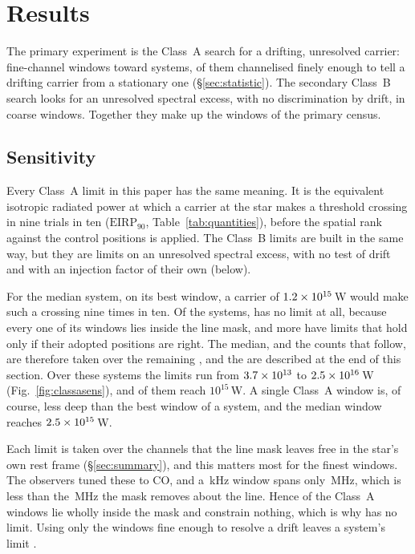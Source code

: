 \section{Results}
\label{sec:results}

The primary experiment is the Class~A search for a drifting, unresolved
carrier: \NWinA{} fine-channel windows toward \NSysClassA{} systems,
\EdrNWinA{} of them channelised finely enough to tell a drifting carrier from
a stationary one (\S\ref{sec:statistic}). The secondary Class~B search looks
for an unresolved spectral excess, with no discrimination by drift, in
\NWinB{} coarse windows. Together they make up the \NWindows{} windows of the
primary census.

\subsection{Sensitivity}
\label{sec:pninetysel}

Every Class~A limit in this paper has the same meaning. It is the
equivalent isotropic radiated power at which a carrier at the star makes a
threshold crossing in nine trials in ten ($\mathrm{EIRP}_{90}$,
Table~\ref{tab:quantities}), before the spatial rank against the control
positions is applied. The Class~B limits are built in the same way, but
they are limits on an unresolved spectral excess, with no test of drift and
with an injection factor of their own (below).

For the median system, on its best window, a carrier of
$1.2\times10^{15}$\,W would make such a crossing nine times in ten. Of the \NSysClassA{} systems,
\NSysALostName{} has no limit at all, because every one of its windows lies
inside the line mask, and \OmNFlagWord{} more have limits that hold only if
their adopted positions are right. The median, and the counts that follow,
are therefore taken over the remaining \NSysALimSum, and the
\OmNFlagWord{} are described at the end of this section. Over these systems
the limits run from $3.7\times10^{13}$ to $2.5\times10^{16}$\,W
(Fig.~\ref{fig:classasens}), and \NSysEfifteen{} of them reach
$10^{15}$\,W. A single Class~A window is, of course, less deep than the best
window of a system, and the median window reaches
$2.5\times10^{15}$\,W.

Each limit is taken over the channels that the line mask leaves free in the
star's own rest frame (\S\ref{sec:summary}), and this matters most for the
finest windows. The observers tuned these to CO, and a
\UmFineChanKHz\,kHz window spans only \UmFineBwMHz\,MHz, which is less than
the \UmFineMaskMHz\,MHz the mask removes about the line. Hence
\UmNWinAFull{} of the Class~A windows lie wholly inside the mask and
constrain nothing, which is why \NSysALostName{} has no limit. Using only the
\EdrNWinA{} windows fine enough to resolve a drift leaves a system's limit
\ScEdrMedClause.

